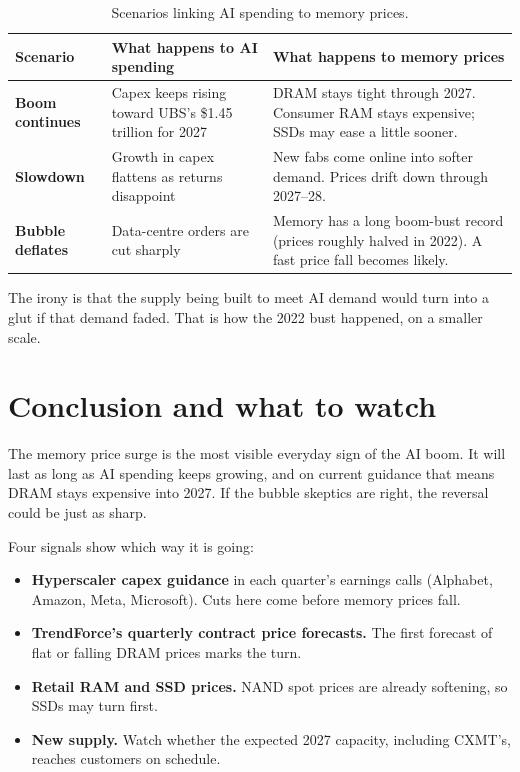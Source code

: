 \documentclass[11pt]{article}
\begin{document}
\begin{table}[h]
  \centering\small
  \begin{tabularx}{\linewidth}{@{}>{\bfseries}p{2.6cm}XX@{}}
    \toprule
    \textnormal{\textbf{Scenario}} & \textbf{What happens to AI spending} & \textbf{What happens to memory prices} \\
    \midrule
    Boom continues & Capex keeps rising toward UBS's \$1.45 trillion for 2027 & DRAM stays tight through 2027. Consumer RAM stays expensive; SSDs may ease a little sooner. \\
    \addlinespace
    Slowdown & Growth in capex flattens as returns disappoint & New fabs come online into softer demand. Prices drift down through 2027--28. \\
    \addlinespace
    Bubble deflates & Data-centre orders are cut sharply & Memory has a long boom-bust record (prices roughly halved in 2022). A fast price fall becomes likely. \\
    \bottomrule
  \end{tabularx}
  \caption{Scenarios linking AI spending to memory prices.}
  \label{tab:scen}
\end{table}

The irony is that the supply being built to meet AI demand would turn into a glut if that demand faded. That is how the 2022 bust happened, on a smaller scale.

\section{Conclusion and what to watch}

The memory price surge is the most visible everyday sign of the AI boom. It will last as long as AI spending keeps growing, and on current guidance that means DRAM stays expensive into 2027. If the bubble skeptics are right, the reversal could be just as sharp.

Four signals show which way it is going:
\begin{itemize}
  \item \textbf{Hyperscaler capex guidance} in each quarter's earnings calls (Alphabet, Amazon, Meta, Microsoft). Cuts here come before memory prices fall.
  \item \textbf{TrendForce's quarterly contract price forecasts.} The first forecast of flat or falling DRAM prices marks the turn.
  \item \textbf{Retail RAM and SSD prices.} NAND spot prices are already softening, so SSDs may turn first.
  \item \textbf{New supply.} Watch whether the expected 2027 capacity, including CXMT's, reaches customers on schedule.
\end{itemize}
\end{document}
